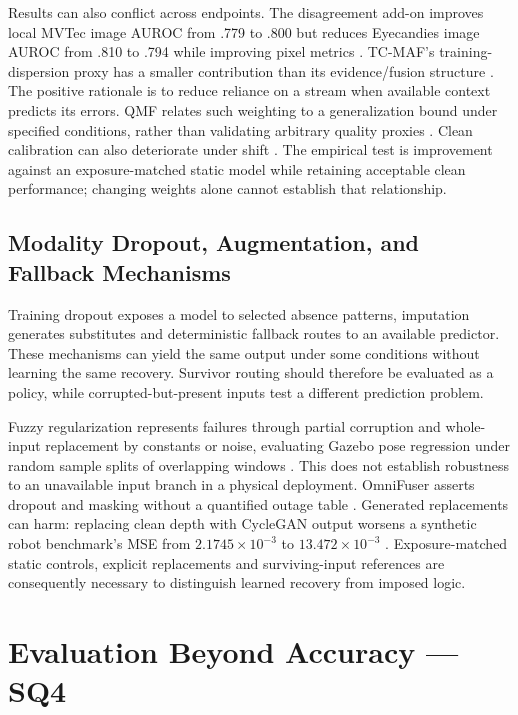 Results can also conflict across endpoints. The disagreement add-on improves local MVTec image AUROC from .779 to .800 but reduces Eyecandies image AUROC from .810 to .794 while improving pixel metrics \citep[PDF pp.~10--11, Tables~4--5]{P033}. TC-MAF's training-dispersion proxy has a smaller contribution than its evidence/fusion structure \citep{P026}. The positive rationale is to reduce reliance on a stream when available context predicts its errors. QMF relates such weighting to a generalization bound under specified conditions, rather than validating arbitrary quality proxies \citep{Zhang2023QMF}. Clean calibration can also deteriorate under shift \citep{P008}. The empirical test is improvement against an exposure-matched static model while retaining acceptable clean performance; changing weights alone cannot establish that relationship.

\subsection{Modality Dropout, Augmentation, and Fallback Mechanisms}
Training dropout exposes a model to selected absence patterns, imputation generates substitutes and deterministic fallback routes to an available predictor. These mechanisms can yield the same output under some conditions without learning the same recovery. Survivor routing should therefore be evaluated as a policy, while corrupted-but-present inputs test a different prediction problem.

Fuzzy regularization represents failures through partial corruption and whole-input replacement by constants or noise, evaluating Gazebo pose regression under random sample splits of overlapping windows \citep[PDF pp.~3--5]{Altinses2023Fuzzy}. This does not establish robustness to an unavailable input branch in a physical deployment. OmniFuser asserts dropout and masking without a quantified outage table \citep[PDF p.~10]{P021}. Generated replacements can harm: replacing clean depth with CycleGAN output worsens a synthetic robot benchmark's MSE from $2.1745\times10^{-3}$ to $13.472\times10^{-3}$ \citep[Table~7]{Altinses2025Performance}. Exposure-matched static controls, explicit replacements and surviving-input references are consequently necessary to distinguish learned recovery from imposed logic.

\section{Evaluation Beyond Accuracy --- SQ4}

